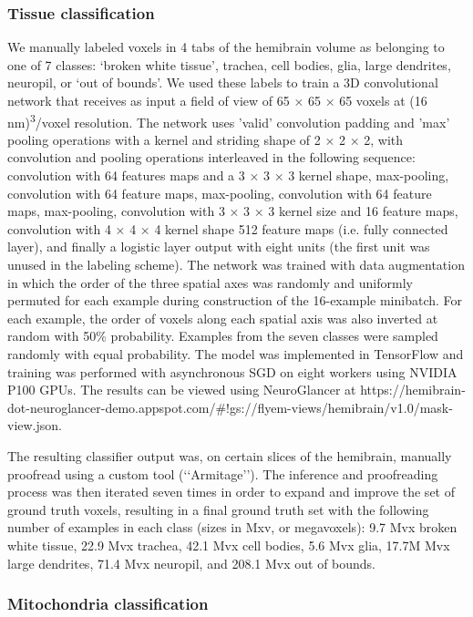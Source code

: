 \documentclass{article}
\begin{document}
\subsubsection*{Tissue classification}

We manually labeled voxels in 4 tabs of the hemibrain volume as belonging to one of 7 classes: ‘broken white tissue’, trachea, cell bodies, glia, large dendrites, neuropil, or ‘out of bounds’. We used these labels to train a 3D convolutional network that receives as input a field of view of 65 × 65 × 65 voxels at (16 nm)\textsuperscript{3}/voxel resolution. The network uses ’valid’ convolution padding and ’max’ pooling operations with a kernel and striding shape of 2 × 2 × 2, with convolution and pooling operations interleaved in the following sequence: convolution with 64 features maps and a 3 × 3 × 3 kernel shape, max-pooling, convolution with 64 feature maps, max-pooling, convolution with 64 feature maps, max-pooling, convolution with 3 × 3 × 3 kernel size and 16 feature maps, convolution with 4 × 4 × 4 kernel shape 512 feature maps (i.e. fully connected layer), and finally a logistic layer output with eight units (the first unit was unused in the labeling scheme). The network was trained with data augmentation in which the order of the three spatial axes was randomly and uniformly permuted for each example during construction of the 16-example minibatch. For each example, the order of voxels along each spatial axis was also inverted at random with 50\% probability. Examples from the seven classes were sampled randomly with equal probability. The model was implemented in TensorFlow and training was performed with asynchronous SGD on eight workers using NVIDIA P100 GPUs. The results can be viewed using NeuroGlancer at https://hemibrain-dot-neuroglancer-demo.appspot.com/\#!gs://flyem-views/hemibrain/v1.0/mask-view.json.

The resulting classifier output was, on certain slices of the hemibrain, manually proofread using a custom tool (‘‘Armitage’’). The inference and proofreading process was then iterated seven times in order to expand and improve the set of ground truth voxels, resulting in a final ground truth set with the following number of examples in each class (sizes in Mxv, or megavoxels): 9.7 Mvx broken white tissue, 22.9 Mvx trachea, 42.1 Mvx cell bodies, 5.6 Mvx glia, 17.7M Mvx large dendrites, 71.4 Mvx neuropil, and 208.1 Mvx out of bounds.

\subsubsection*{Mitochondria classification}
\end{document}
